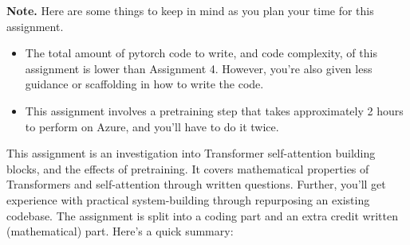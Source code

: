 \begin{framed}
\noindent
 \textbf{Note.} Here are some things to keep in mind as you plan your time for this assignment.
\begin{itemize}
   \item The total amount of pytorch code to write, and code complexity, of this assignment is lower than Assignment 4. 
         However, you're also given less guidance or scaffolding in how to write the code.
         \item  This assignment involves a pretraining step that takes approximately 2 hours to perform on Azure, and you'll have to do it twice.
\end{itemize}
\end{framed}
This assignment is an investigation into Transformer self-attention building blocks, and the effects of pretraining.
It covers mathematical properties of Transformers and self-attention through written questions.
Further, you'll get experience with practical system-building through repurposing an existing codebase.
The assignment is split into a coding part and an extra credit written (mathematical) part.
Here's a quick summary:
